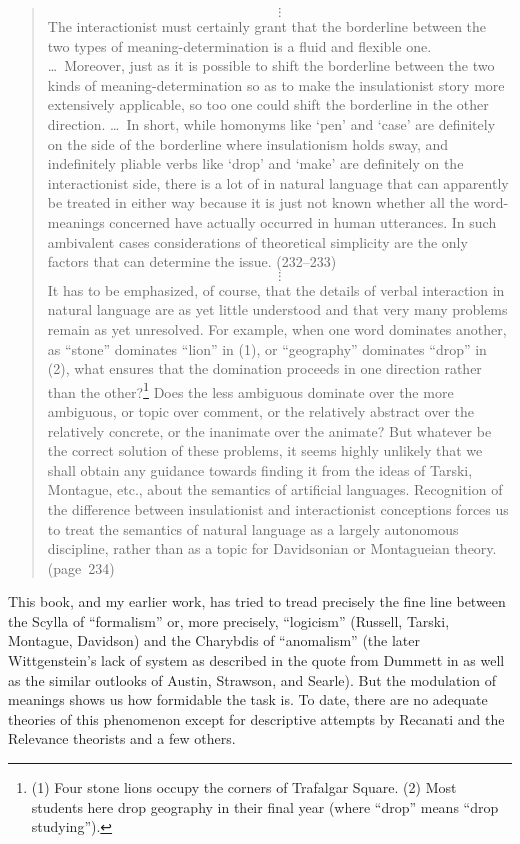 \begin{quote}
\[\vdots\]
The interactionist must certainly grant that the borderline between the two types of meaning-determination is a fluid and flexible one. \ldots\ Moreover, just as it is possible to shift the borderline between the two kinds of meaning-determination so as to make the insulationist story more extensively applicable, so too one could shift the borderline in the other direction. \ldots\ In short, while homonyms like `pen' and `case' are definitely on the side of the borderline where insulationism holds sway, and indefinitely pliable verbs like `drop' and `make' are definitely on the interactionist side, there is a lot of  in natural language that can apparently be treated in either way because it is just not known whether all the word-meanings concerned have actually occurred in human utterances. In such ambivalent cases considerations of theoretical simplicity are the only factors that can determine the issue. (232--233)
\[\vdots\]
It has to be emphasized, of course, that the details of verbal interaction in natural language are as yet little understood and that very many problems remain as yet unresolved. For example, when one word dominates another, as ``stone'' dominates ``lion'' in (1), or ``geography'' dominates ``drop'' in (2), what ensures that the domination proceeds in one direction rather than the other?\footnote{(1) Four stone lions occupy the corners of Trafalgar Square. (2) Most students here drop geography in their final year (where ``drop'' means ``drop studying'').} Does the less ambiguous dominate over the more ambiguous, or topic over comment, or the relatively abstract over the relatively concrete, or the inanimate over the animate? But whatever be the correct solution of these problems, it seems highly unlikely that we shall obtain any guidance towards finding it from the ideas of Tarski, Montague, etc., about the semantics of artificial languages. Recognition of the difference between insulationist and interactionist conceptions forces us to treat the semantics of natural language as a largely autonomous discipline, rather than as a topic for Davidsonian or Montagueian theory. (page~234)

\end{quote}

This book, and my earlier work, has tried to tread precisely the fine line between the Scylla of ``formalism'' or, more precisely, ``logicism'' (Russell, Tarski, Montague, Davidson) and the Charybdis of ``anomalism'' (the later Wittgenstein's lack of system as described in the quote from Dummett in  as well as the similar outlooks of Austin, Strawson, and Searle). But the modulation of meanings shows us how formidable the task is. To date, there are no adequate theories of this phenomenon except for descriptive attempts by Recanati and the Relevance theorists and a few others.

